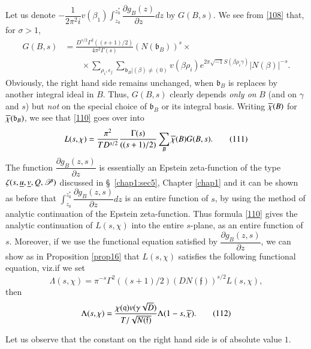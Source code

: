 Let us denote
$-\dfrac{1}{2\pi^{2}i}v(\beta_{1})\int^{z^{\ast}_{0}}_{z_{0}}\dfrac{\partial
  g_{B}(z)}{\partial z}dz$ by $G(B,s)$. We see from \eqref{108} that,
for $\sigma>1$,
\begin{align*}
G(B,s) &=
\frac{D^{s/2}\Gamma^{2}((s+1)/2)}{4\pi^{2}\Gamma(s)}(N(\mathfrak{b}_{B}))^{s}\times
\\
&\qquad
\times\sum_{\rho_{i},\epsilon_{j}}\sum_{\mathfrak{b}_{B}|(\beta)\neq(0)}v(\beta\rho_{i})e^{2\pi\sqrt{-1}S(\beta\rho_{i}\gamma)}|N(\beta)|^{-s}. 
\end{align*}\pageoriginale
Obviously, the right hand side remains unchanged, when
$\mathfrak{b}_{B}$ is replaces by another integral ideal in $B$. Thus,
$G(B,s)$ clearly depends {\em only on} $B$ (and on $\gamma$ and $s$)
but {\em not} on the special choice of $\mathfrak{b}_{B}$ or its
integral basis. Writing $\overline{\chi}(B)$ for
$\overline{\chi}(\mathfrak{b}_{B})$, we see that \eqref{110} goes over into
\begin{equation*}
L(s,\chi)=\frac{\pi^{2}}{TD^{s/2}}\frac{\Gamma(s)}{((s+1)/2)}\sum_{B}\overline{\chi}(B)G(B,s).\tag{111}\label{111}
\end{equation*}
The function $\dfrac{\partial g_{B}(z,s)}{\partial z}$ is essentially
an Epstein zeta-function of the type
$\zeta(s,\underline{u},\underline{v},Q,\mathscr{P})$ discussed in
\S\ \ref{chap1:sec5}, Chapter \ref{chap1} 
and it can be shown as before that
$\int^{z^{\ast}_{0}}_{z_{0}}\dfrac{\partial g_{B}(z,s)}{\partial z}dz$
is an entire function of $s$, by using the method of analytic
continuation of the Epstein zeta-function. Thus formula \eqref{110}
gives the analytic continuation of $L(s,\chi)$ into the entire
$s$-plane, as an entire function of $s$. Moreover, if we use the
functional equation satisfied by $\dfrac{\partial g_{B}(z,s)}{\partial
  z}$, we can show as in Proposition \ref{prop16} that $L(s,\chi)$
satisfies the following functional equation, viz.\@ if we set
$$
\Lambda(s,\chi)=\pi^{-s}\Gamma^{2}((s+1)/2)(DN(\mathfrak{f}))^{s/2}L(s,\chi),
$$
then
\begin{equation*}
\Lambda(s,\chi)=\frac{\chi(\mathfrak{q})v(\gamma\sqrt{D})}{T/\sqrt{N(\mathfrak{f})}}\Lambda(1-s,\overline{\chi}).\tag{112}\label{112}  
\end{equation*}

Let us observe that the constant on the right hand side is of absolute
value $1$.

